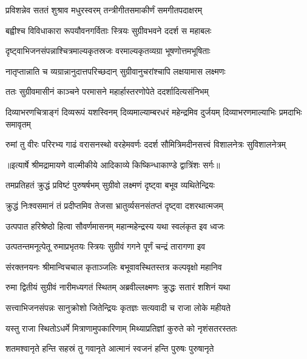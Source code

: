 \twolineshloka
{प्रविशन्नेव सततं शुश्राव मधुरस्वरम्}
{तन्त्रीगीतसमाकीर्णं समगीतपदाक्षरम्} %

\twolineshloka
{बह्वीश्च विविधाकारा रूपयौवनगर्विताः}
{स्त्रियः सुग्रीवभवने ददर्श स महाबलः} %

\twolineshloka
{दृष्ट्वाभिजनसंपन्नाश्चित्रमाल्यकृतस्रजः}
{वरमाल्यकृतव्यग्रा भूषणोत्तमभूषिताः} %

\twolineshloka
{नातृप्तान्नाति च व्यग्रान्नानुदात्तपरिच्छदान्}
{सुग्रीवानुचरांश्चापि लक्षयामास लक्ष्मणः} %

\twolineshloka
{ततः सुग्रीवमासीनं काञ्चने परमासने}
{महार्हास्तरणोपेते ददर्शादित्यसंनिभम्} %

\threelineshloka
{दिव्याभरणचित्राङ्गं दिव्यरूपं यशस्विनम्}
{दिव्यमाल्याम्बरधरं महेन्द्रमिव दुर्जयम्}
{दिव्याभरणमाल्याभिः प्रमदाभिः समावृतम्} %

\fourlineindentedshloka
{रुमां तु वीरः परिरभ्य गाढं}
{ वरासनस्थो वरहेमवर्णः}
{ददर्श सौमित्रिमदीनसत्त्वं}
{ विशालनेत्रः सुविशालनेत्रम्} %


{॥इत्यार्षे श्रीमद्रामायणे वाल्मीकीये आदिकाव्ये किष्किन्धाकाण्डे द्वात्रिंशः सर्गः॥}


\twolineshloka
{तमप्रतिहतं क्रुद्धं प्रविष्टं पुरुषर्षभम्}
{सुग्रीवो लक्ष्मणं दृष्ट्वा बभूव व्यथितेन्द्रियः} %

\twolineshloka
{क्रुद्धं निःश्वसमानं तं प्रदीप्तमिव तेजसा}
{भ्रातुर्व्यसनसंतप्तं दृष्ट्वा दशरथात्मजम्} %

\twolineshloka
{उत्पपात हरिश्रेष्ठो हित्वा सौवर्णमासनम्}
{महान्महेन्द्रस्य यथा स्वलंकृत इव ध्वजः} %

\twolineshloka
{उत्पतन्तमनूत्पेतू रुमाप्रभृतयः स्त्रियः}
{सुग्रीवं गगने पूर्णं चन्द्रं तारागणा इव} %

\twolineshloka
{संरक्तनयनः श्रीमान्विचचाल कृताञ्जलिः}
{बभूवावस्थितस्तत्र कल्पवृक्षो महानिव} %

\twolineshloka
{रुमा द्वितीयं सुग्रीवं नारीमध्यगतं स्थितम्}
{अब्रवील्लक्ष्मणः क्रुद्धः सतारं शशिनं यथा} %

\twolineshloka
{सत्त्वाभिजनसंपन्नः सानुक्रोशो जितेन्द्रियः}
{कृतज्ञः सत्यवादी च राजा लोके महीयते} %

\twolineshloka
{यस्तु राजा स्थितोऽधर्मे मित्राणामुपकारिणाम्}
{मिथ्याप्रतिज्ञां कुरुते को नृशंसतरस्ततः} %

\twolineshloka
{शतमश्वानृते हन्ति सहस्रं तु गवानृते}
{आत्मानं स्वजनं हन्ति पुरुषः पुरुषानृते} %

